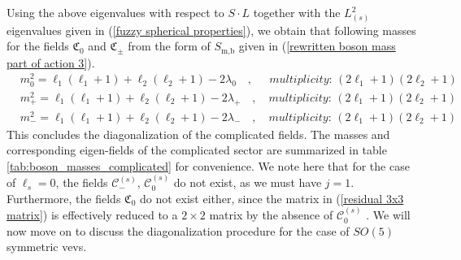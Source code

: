\newpage
Using the above eigenvalues with respect to $S \cdot L$ together with the $L_{(s)}^2$ eigenvalues given in (\ref{fuzzy spherical properties}), we obtain that following masses for the fields $\mathfrak{C}_0$ and $\mathfrak{C}_{\pm}$ from the form of $S_{\text{m,b}}$ given in (\ref{rewritten boson mass part of action 3}).
%
%
\begin{align}
& m^2_{0} = \ell_1 (\ell_1 + 1) + \ell_2 (\ell_2 + 1) - 2 \lambda_0
%
\quad , \quad\;\,
%
\textit{multiplicity: } (2 \ell_1 + 1) (2 \ell_2 + 1)
\\
& m^2_{+} = \ell_1 (\ell_1 + 1) + \ell_2 (\ell_2 + 1) - 2 \lambda_{+}
%
\quad , \quad
%
\textit{multiplicity: } (2 \ell_1 + 1) (2 \ell_2 + 1)
\\
& m^2_{-} = \ell_1 (\ell_1 + 1) + \ell_2 (\ell_2 + 1) - 2 \lambda_{-}
%
\quad , \quad
%
\textit{multiplicity: } (2 \ell_1 + 1) (2 \ell_2 + 1)
\end{align}
%
%
This concludes the diagonalization of the complicated fields. The masses and corresponding eigen-fields of the complicated sector are summarized in table \ref{tab:boson_masses_complicated} for convenience. We note here that for the case of $\ell_s = 0$, the fields $\mathcal{C}^{(s)}_{-}$, $\mathcal{C}^{(s)}_{0}$ do not exist, as we must have $j=1$. Furthermore, the fields $\mathfrak{C}_0$ do not exist either, since the matrix in (\ref{residual 3x3 matrix}) is effectively reduced to a $2 \times 2$ matrix by the absence of $\mathcal{C}^{(s)}_{0}$ \cite{Two-point functions in D5-D3}. We will now move on to discuss the diagonalization procedure for the case of $SO(5)$ symmetric vevs.
%
%
